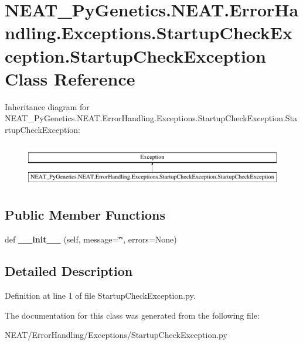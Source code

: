 \hypertarget{class_n_e_a_t___py_genetics_1_1_n_e_a_t_1_1_error_handling_1_1_exceptions_1_1_startup_check_exce2a8a81d294d367a07fcb941ca1614ae5}{}\section{N\+E\+A\+T\+\_\+\+Py\+Genetics.\+N\+E\+A\+T.\+Error\+Handling.\+Exceptions.\+Startup\+Check\+Exception.\+Startup\+Check\+Exception Class Reference}
\label{class_n_e_a_t___py_genetics_1_1_n_e_a_t_1_1_error_handling_1_1_exceptions_1_1_startup_check_exce2a8a81d294d367a07fcb941ca1614ae5}
Inheritance diagram for N\+E\+A\+T\+\_\+\+Py\+Genetics.\+N\+E\+A\+T.\+Error\+Handling.\+Exceptions.\+Startup\+Check\+Exception.\+Startup\+Check\+Exception\+:\begin{figure}[H]
\begin{center}
\leavevmode
\includegraphics[height=1.931034cm]{class_n_e_a_t___py_genetics_1_1_n_e_a_t_1_1_error_handling_1_1_exceptions_1_1_startup_check_exce2a8a81d294d367a07fcb941ca1614ae5}
\end{center}
\end{figure}
\subsection*{Public Member Functions}
\begin{DoxyCompactItemize}
\item 
def {\bfseries \+\_\+\+\_\+init\+\_\+\+\_\+} (self, message=\char`\"{}\char`\"{}, errors=None)\hypertarget{class_n_e_a_t___py_genetics_1_1_n_e_a_t_1_1_error_handling_1_1_exceptions_1_1_startup_check_exce2a8a81d294d367a07fcb941ca1614ae5_a39cbd39c3a77f3acc9c3feb3bfb84d7e}{}\label{class_n_e_a_t___py_genetics_1_1_n_e_a_t_1_1_error_handling_1_1_exceptions_1_1_startup_check_exce2a8a81d294d367a07fcb941ca1614ae5_a39cbd39c3a77f3acc9c3feb3bfb84d7e}

\end{DoxyCompactItemize}


\subsection{Detailed Description}


Definition at line 1 of file Startup\+Check\+Exception.\+py.



The documentation for this class was generated from the following file\+:\begin{DoxyCompactItemize}
\item 
N\+E\+A\+T/\+Error\+Handling/\+Exceptions/Startup\+Check\+Exception.\+py\end{DoxyCompactItemize}
